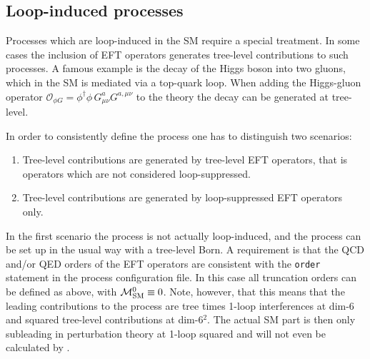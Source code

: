 \subsection{Loop-induced processes}\label{sec:loop-induced}
Processes which are loop-induced in the SM require a special treatment. In some cases the inclusion of EFT operators generates tree-level contributions to such processes. A famous example is the decay of the Higgs boson into two gluons, which in the SM is mediated via a top-quark loop. When adding the Higgs-gluon operator $\mathcal{O}_{\phi G} = \phi^\dagger\phi\,G^a_{\mu\nu}G^{a,\mu\nu}$ to the theory the decay can be generated at tree-level.

In order to consistently define the process one has to distinguish two scenarios:
\begin{enumerate}
   \item Tree-level contributions are generated by tree-level EFT operators, that is operators which are not considered loop-suppressed.
   \item Tree-level contributions are generated by loop-suppressed EFT operators only.
\end{enumerate}
In the first scenario the process is not actually loop-induced, and the process can be set up in the usual way with a tree-level Born. A requirement is that the QCD and/or QED orders of the EFT operators are consistent with the \texttt{order} statement in the process configuration file. In this case all truncation orders can be defined as above, with $\mathcal{M}_\mathrm{SM}^0\equiv0$. Note, however, that this means that the leading contributions to the process are tree times 1-loop interferences at dim-6 and squared tree-level contributions at dim-6$^2$. The actual SM part is then only subleading in perturbation theory at 1-loop squared and will not even be calculated by \gosam. 

